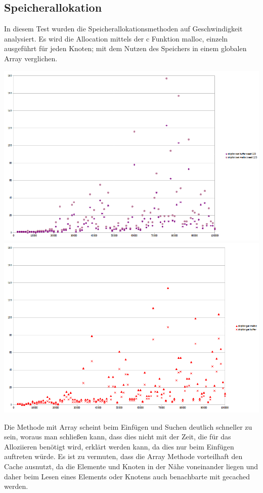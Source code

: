 \documentclass{TUBAFarbeiten}
\begin{document}
\subsection{Speicherallokation}

In diesem Test wurden die Speicherallokationsmethoden auf Geschwindigkeit analysiert. Es wird die Allocation mittels der c Funktion malloc, einzeln ausgeführt für jeden Knoten; mit dem Nutzen des Speichers in einem globalen Array verglichen. 

\includegraphics[scale=0.55]{img/diagram_malloc_array_set}
\label{fig:Img7}
\includegraphics[scale=0.55]{img/diagram_malloc_array_get}
\label{fig:Img8}

Die Methode mit Array scheint beim Einfügen und Suchen deutlich schneller zu sein, woraus man schließen kann, dass dies nicht mit der Zeit, die für das Alloziieren benötigt wird, erklärt werden kann, da dies nur beim Einfügen auftreten würde. Es ist zu vermuten, dass die Array Methode vorteilhaft den Cache ausnutzt, da die Elemente und Knoten in der Nähe voneinander liegen und daher beim Lesen eines Elements oder Knotens auch benachbarte mit gecached werden. 
\end{document}
